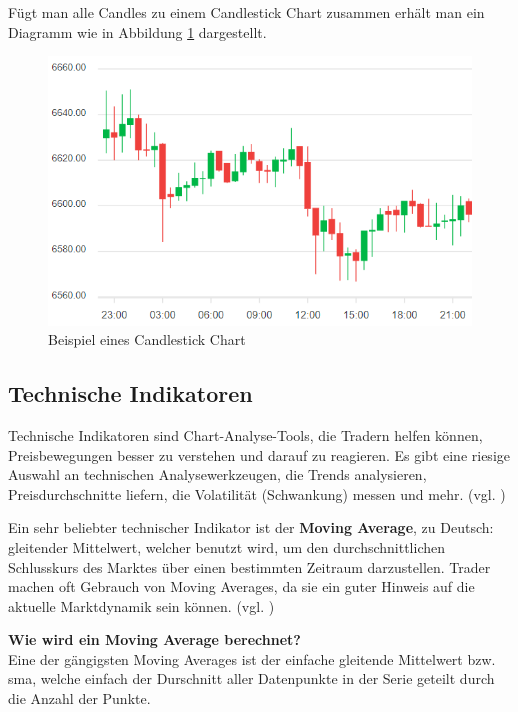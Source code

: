 \documentclass[oneside]{ausarbeitung}
\begin{document}
Fügt man alle Candles zu einem Candlestick Chart zusammen erhält man
ein Diagramm wie in Abbildung \ref{fig:2} dargestellt. \\

\begin{figure}[H]
  \centering
  \includegraphics[height=0.43\textheight]{img/candlestick_chart.png}
  \caption{Beispiel eines Candlestick Chart\cite{candlestick_chart_pic}}
  \label{fig:2}
\end{figure}

\subsection{Technische Indikatoren}
\label{sub:technische_Indikatoren}

Technische Indikatoren sind Chart-Analyse-Tools, die Tradern helfen
können, Preisbewegungen besser zu verstehen und darauf zu reagieren.
Es gibt eine riesige Auswahl an technischen Analysewerkzeugen, die
Trends analysieren, Preisdurchschnitte liefern, die Volatilität
(Schwankung) messen und mehr. (vgl. \cite{technical_indicators})

Ein sehr beliebter technischer Indikator ist der \textbf{Moving
Average}, zu Deutsch: gleitender Mittelwert, welcher benutzt wird, um
den durchschnittlichen Schlusskurs des Marktes über einen bestimmten
Zeitraum darzustellen. Trader machen oft Gebrauch von Moving Averages,
da sie ein guter Hinweis auf die aktuelle Marktdynamik sein können.
(vgl. \cite{moving_average})

\textbf{Wie wird ein Moving Average berechnet?} \\
Eine der gängigsten Moving Averages ist der einfache gleitende
Mittelwert bzw. \ac{sma}, welche einfach der Durschnitt aller
Datenpunkte in der Serie geteilt durch die Anzahl der
Punkte\cite{moving_average}.
\end{document}
